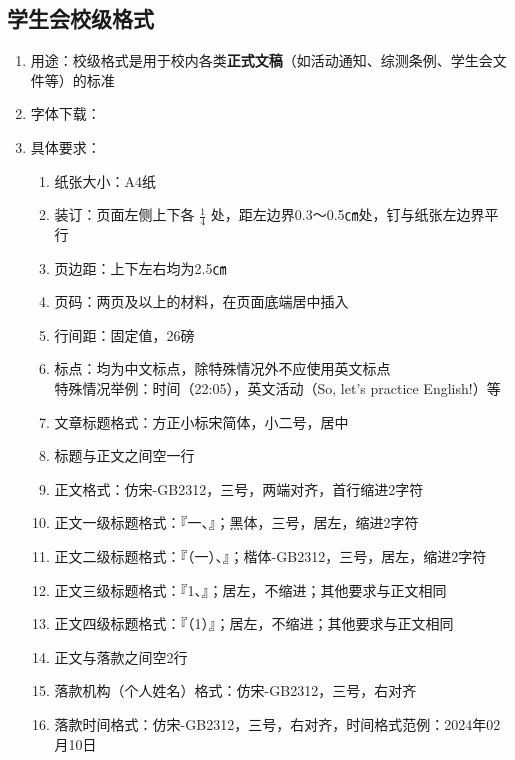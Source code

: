\subsection[学生会校级格式]{学生会校级格式}
\begin{enumerate}
    \item 用途：校级格式是用于校内各类\textbf{正式文稿}（如活动通知、综测条例、学生会文件等）的标准
    \item 字体下载：
    \item 具体要求：
          \begin{enumerate}
              \item 纸张大小：A4纸
              \item 装订：页面左侧上下各 $\frac{1}{4}$ 处，距左边界0.3～0.5㎝处，钉与纸张左边界平行
              \item 页边距：上下左右均为2.5㎝
              \item 页码：两页及以上的材料，在页面底端居中插入
              \item 行间距：固定值，26磅
              \item 标点：均为中文标点，除特殊情况外不应使用英文标点\\
                    特殊情况举例：时间（22:05），英文活动（So, let's practice English!）等
              \item 文章标题格式：方正小标宋简体，小二号，居中
              \item 标题与正文之间空一行
              \item 正文格式：仿宋-GB2312，三号，两端对齐，首行缩进2字符
              \item 正文一级标题格式：『一、』；黑体，三号，居左，缩进2字符
              \item 正文二级标题格式：『（一）、』；楷体-GB2312，三号，居左，缩进2字符
              \item 正文三级标题格式：『1、』；居左，不缩进；其他要求与正文相同
              \item 正文四级标题格式：『（1）』；居左，不缩进；其他要求与正文相同
              \item 正文与落款之间空2行
              \item 落款机构（个人姓名）格式：仿宋-GB2312，三号，右对齐
              \item 落款时间格式：仿宋-GB2312，三号，右对齐，时间格式范例：2024年02月10日
          \end{enumerate}
\end{enumerate}

